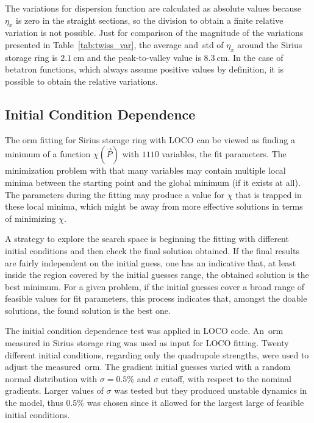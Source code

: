 The variations for dispersion function are calculated as absolute values because $\eta_x$ is zero in the straight sections, so the division to obtain a finite relative variation is not possible. Just for comparison of the magnitude of the variations presented in Table~\ref{tab:twiss_var}, the average and~\gls{std} of $\eta_x$ around the Sirius storage ring is $\SI{2.1}{\cm}$ and the peak-to-valley value is $\SI{8.3}{\cm}$. In the case of betatron functions, which always assume positive values by definition, it is possible to obtain the relative variations.

\subsection{Initial Condition Dependence}
The \gls{orm} fitting for Sirius storage ring with LOCO can be viewed as finding a minimum of a function $\chi\left(\Vec{P}\right)$ with $1110$ variables, the fit parameters. The minimization problem with that many variables may contain multiple local minima between the starting point and the global minimum (if it exists at all). The parameters during the fitting may produce a value for $\chi$ that is trapped in these local minima, which might be away from more effective solutions in terms of minimizing $\chi$.

A strategy to explore the search space is beginning the fitting with different initial conditions and then check the final solution obtained. If the final results are fairly independent on the initial guess, one has an indicative that, at least inside the region covered by the initial guesses range, the obtained solution is the best minimum. For a given problem, if the initial guesses cover a broad range of feasible values for fit parameters, this process indicates that, amongst the doable solutions, the found solution is the best one.

The initial condition dependence test was applied in LOCO code. An~\gls{orm} measured in Sirius storage ring was used as input for LOCO fitting. Twenty different initial conditions, regarding only the quadrupole strengths, were used to adjust the measured~\gls{orm}. The gradient initial guesses varied with a random normal distribution with $\sigma=0.5\%$ and $\sigma$ cutoff, with respect to the nominal gradients. Larger values of $\sigma$ was tested but they produced unstable dynamics in the model, thus $0.5\%$ was chosen since it allowed for the largest large of feasible initial conditions.

